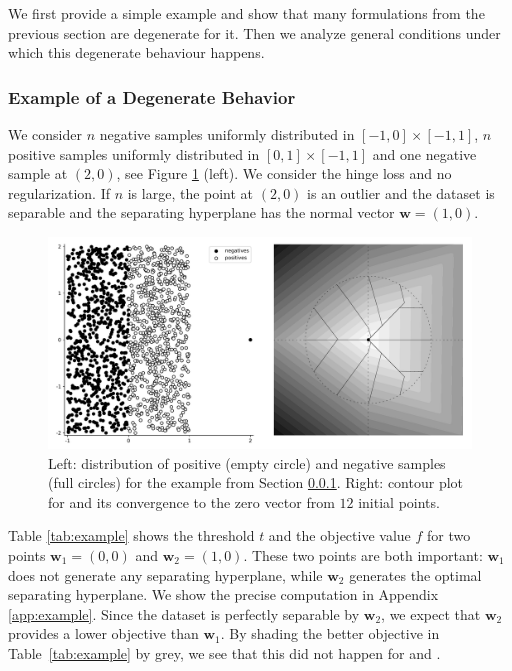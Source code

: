 We first provide a simple example and show that many formulations from the previous section are degenerate for it. Then we analyze general conditions under which this degenerate behaviour happens.

\subsubsection{Example of a Degenerate Behavior}\label{sec:example}

We consider $n$ negative samples uniformly distributed in $[-1,0]\times[-1,1]$, $n$ positive samples uniformly distributed in $[0,1]\times[-1,1]$ and one negative sample at $(2,0)$, see Figure \ref{fig:example} (left). We consider the hinge loss and no regularization. If $n$ is large, the point at $(2,0)$ is an outlier and the dataset is separable and the separating hyperplane has the normal vector $\bm{w}=(1,0)$. 

\begin{figure}[!ht]
  \centering
  \includegraphics[width=0.7\linewidth]{images/toppush_convergence.pdf}
  \caption{Left: distribution of positive (empty circle) and negative samples (full circles) for the example from Section \ref{sec:example}. Right: contour plot for \TopPush and its convergence to the zero vector from $12$ initial points.}
  \label{fig:example}
\end{figure}

Table \ref{tab:example} shows the threshold $t$ and the objective value $f$ for two points $\bm{w}_1=(0,0)$ and $\bm{w}_2=(1,0)$. These two points are both important: $\bm{w}_1$ does not generate any separating hyperplane, while $\bm{w}_2$ generates the optimal separating hyperplane. We show the precise computation in Appendix \ref{app:example}. Since the dataset is perfectly separable by $\bm{w}_2$, we expect that $\bm{w}_2$ provides a lower objective than $\bm{w}_1$. By shading the better objective in Table~\ref{tab:example} by grey, we see that this did not happen for \TopPush and \TopMeanK.

